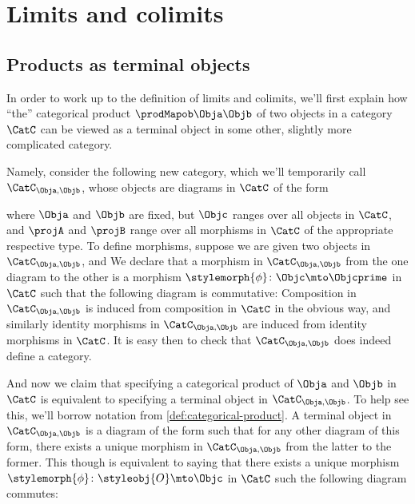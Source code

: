

\section{Limits and colimits}



\subsection{Products as terminal objects}

In order to work up to the definition of limits and colimits, we'll first explain how ``the'' categorical product $\prodMapob \Obja \Objb$ of two objects in a category $\CatC$ can be viewed as a terminal object in some other, slightly more complicated category. 

Namely, consider the following new category, which we'll temporarily call $\CatC_{\Obja, \Objb}$, whose objects are diagrams in $\CatC$ of the form

where $\Obja$ and $\Objb$ are fixed, but $\Objc$ ranges over all objects in $\CatC$, and $\projA$ and $\projB$ range over all morphisms in $\CatC$ of the appropriate respective type. To define morphisms, suppose we are given two objects in $\CatC_{\Obja, \Objb}$, 
and
We declare that a morphism in $\CatC_{\Obja, \Objb}$ from the one diagram to the other is a morphism $\stylemorph{\phi} \colon \Objc \mto \Objcprime$ in $\CatC$ such that the following diagram is commutative: 
Composition in $\CatC_{\Obja, \Objb}$ is induced from composition in $\CatC$ in the obvious way, and similarly identity morphisms in $\CatC_{\Obja, \Objb}$ are induced from identity morphisms in $\CatC$. It is easy then to check that $\CatC_{\Obja, \Objb}$ does indeed define a category. 

And now we claim that specifying a categorical product of $\Obja$ and $\Objb$ in $\CatC$ is equivalent to specifying a terminal object in $\CatC_{\Obja, \Objb}$. To help see this, we'll borrow notation from \cref{def:categorical-product}. A terminal object in $\CatC_{\Obja, \Objb}$ is a diagram of the form
such that for any other diagram of this form, 
there exists a unique morphism in $\CatC_{\Obja, \Objb}$ from the latter to the former. This though is equivalent to saying that there exists a unique morphism $\stylemorph{\phi} \colon \styleobj{O} \mto \Objc$ in $\CatC$ such the following diagram commutes:


